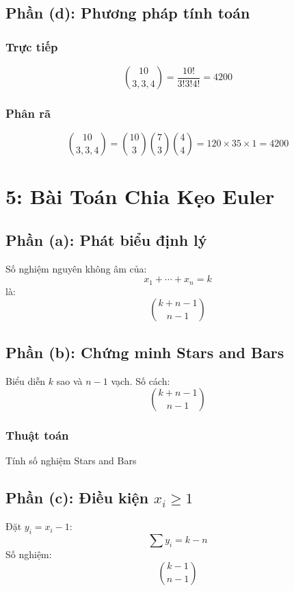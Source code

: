 \documentclass[a4paper,12pt]{article}
\theoremstyle{plain}
\theoremstyle{definition}
\begin{document}
\subsection*{Phần (d): Phương pháp tính toán}

\subsubsection*{Trực tiếp}
\[
\binom{10}{3,3,4} = \frac{10!}{3!3!4!} = 4200
\]

\subsubsection*{Phân rã}
\[
\binom{10}{3,3,4} = \binom{10}{3}\binom{7}{3}\binom{4}{4} = 120 \times 35 \times 1 = 4200
\]

\section*{5: Bài Toán Chia Kẹo Euler}

\subsection*{Phần (a): Phát biểu định lý}
Số nghiệm nguyên không âm của:
\[
x_1 + \cdots + x_n = k
\]
là:
\[
\binom{k+n-1}{n-1}
\]

\subsection*{Phần (b): Chứng minh Stars and Bars}

Biểu diễn \( k \) sao và \( n-1 \) vạch. Số cách:
\[
\binom{k+n-1}{n-1}
\]

\subsubsection*{Thuật toán}
\begin{algorithm}
\caption{Tính số nghiệm Stars and Bars}
\begin{algorithmic}
    \State \Return {}
\EndFunction
\end{algorithmic}
\end{algorithm}

\subsection*{Phần (c): Điều kiện \( x_i \geq 1 \)}
Đặt \( y_i = x_i - 1 \):
\[
\sum y_i = k - n
\]
Số nghiệm:
\[
\binom{k-1}{n-1}
\]
\end{document}
